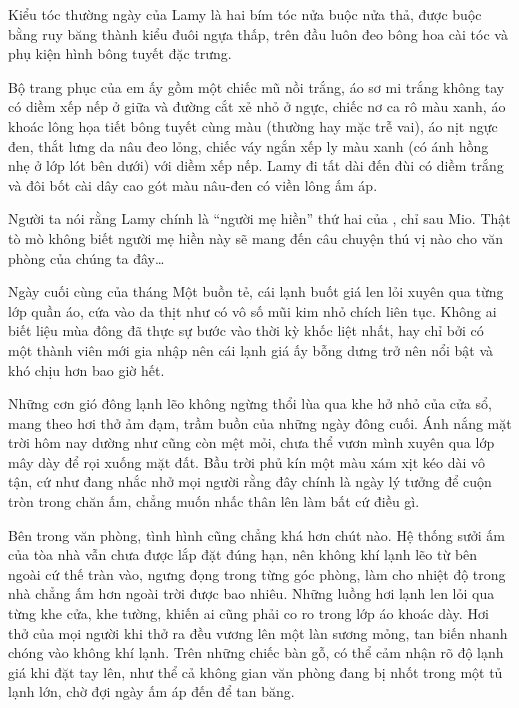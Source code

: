 \documentclass[../main.tex]{subfiles}
\begin{document}
Kiểu tóc thường ngày của Lamy là hai bím tóc nửa buộc nửa thả, được buộc bằng ruy băng thành kiểu đuôi ngựa thấp, trên đầu luôn đeo bông hoa cài tóc và phụ kiện hình bông tuyết đặc trưng.

Bộ trang phục của em ấy gồm một chiếc mũ nồi trắng, áo sơ mi trắng không tay có diềm xếp nếp ở giữa và đường cắt xẻ nhỏ ở ngực, chiếc nơ ca rô màu xanh, áo khoác lông họa tiết bông tuyết cùng màu (thường hay mặc trễ vai), áo nịt ngực đen, thắt lưng da nâu đeo lỏng, chiếc váy ngắn xếp ly màu xanh (có ánh hồng nhẹ ở lớp lót bên dưới) với diềm xếp nếp. Lamy đi tất dài đến đùi có diềm trắng và đôi bốt cài dây cao gót màu nâu-đen có viền lông ấm áp.

\chrint

Người ta nói rằng Lamy chính là ``người mẹ hiền'' thứ hai của \hll, chỉ sau Mio. Thật tò mò không biết người mẹ hiền này sẽ mang đến câu chuyện thú vị nào cho văn phòng của chúng ta đây\dots

\il

Ngày cuối cùng của tháng Một buồn tẻ, cái lạnh buốt giá len lỏi xuyên qua từng lớp quần áo, cứa vào da thịt như có vô số mũi kim nhỏ chích liên tục. Không ai biết liệu mùa đông đã thực sự bước vào thời kỳ khốc liệt nhất, hay chỉ bởi có một thành viên mới gia nhập nên cái lạnh giá ấy bỗng dưng trở nên nổi bật và khó chịu hơn bao giờ hết.

Những cơn gió đông lạnh lẽo không ngừng thổi lùa qua khe hở nhỏ của cửa sổ, mang theo hơi thở ảm đạm, trầm buồn của những ngày đông cuối. Ánh nắng mặt trời hôm nay dường như cũng còn mệt mỏi, chưa thể vươn mình xuyên qua lớp mây dày để rọi xuống mặt đất. Bầu trời phủ kín một màu xám xịt kéo dài vô tận, cứ như đang nhắc nhở mọi người rằng đây chính là ngày lý tưởng để cuộn tròn trong chăn ấm, chẳng muốn nhấc thân lên làm bất cứ điều gì.

Bên trong văn phòng, tình hình cũng chẳng khá hơn chút nào. Hệ thống sưởi ấm của tòa nhà vẫn chưa được lắp đặt đúng hạn, nên không khí lạnh lẽo từ bên ngoài cứ thế tràn vào, ngưng đọng trong từng góc phòng, làm cho nhiệt độ trong nhà chẳng ấm hơn ngoài trời được bao nhiêu. Những luồng hơi lạnh len lỏi qua từng khe cửa, khe tường, khiến ai cũng phải co ro trong lớp áo khoác dày. Hơi thở của mọi người khi thở ra đều vương lên một làn sương mỏng, tan biến nhanh chóng vào không khí lạnh. Trên những chiếc bàn gỗ, có thể cảm nhận rõ độ lạnh giá khi đặt tay lên, như thể cả không gian văn phòng đang bị nhốt trong một tủ lạnh lớn, chờ đợi ngày ấm áp đến để tan băng.
\end{document}
